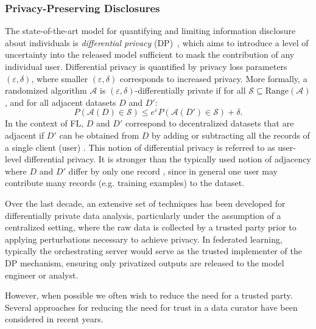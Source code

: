 \documentclass[11pt]{article}
\begin{document}
\subsubsection{Privacy-Preserving Disclosures}
\label{sssec:private_disclosures}

The state-of-the-art model for quantifying and limiting information disclosure about individuals is \textit{differential privacy} (DP)~\cite{DMNS06, dwork2008differential, dwork2014algorithmic}, which aims to introduce a level of uncertainty into the released model sufficient to mask the contribution of any individual user. Differential privacy is quantified by privacy loss parameters $(\varepsilon, \delta)$, where smaller $(\varepsilon, \delta)$ corresponds to increased privacy. More formally,  a randomized algorithm $\mathcal{A}$ is $(\varepsilon, \delta)$-differentially private if for all $\mathcal{S} \subseteq \text{Range}(\mathcal{A})$, and for all adjacent datasets $D$ and $D'$:
\begin{equation}
\label{eq-dp}
P(\mathcal{A}(D) \in \mathcal{S}) \le e^\varepsilon P(\mathcal{A}(D') \in \mathcal{S}) + \delta.
\end{equation}
In the context of FL, $D$ and $D'$ correspond to decentralized datasets that are adjacent if $D'$ can be obtained from $D$ by adding or subtracting all the records of a single client (user) \citep{mcmahan18dplm}. This notion of differential privacy is referred to as user-level differential privacy. It is stronger than the typically used notion of adjacency where $D$ and $D'$ differ by only one record \citep{dwork2014algorithmic}, since in general one user may contribute many records (e.g. training examples) to the dataset.


Over the last decade, an extensive set of techniques has been developed for differentially private data analysis, particularly under the assumption of a centralized setting, where the raw data is collected by a trusted party prior to applying perturbations necessary to achieve privacy. In federated learning, typically the orchestrating server would serve as the trusted implementer of the DP mechanism, ensuring only privatized outputs are released to the model engineer or analyst.

However, when possible we often wish to reduce the need for a trusted party. Several approaches for reducing the need for trust in a data curator have been considered in recent years.
\end{document}
